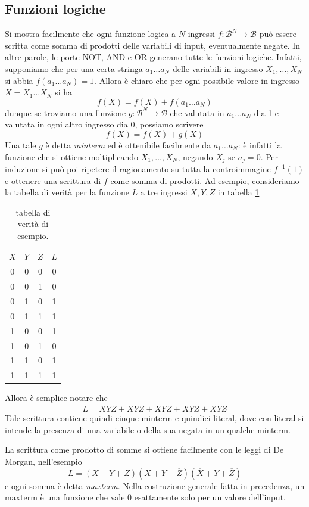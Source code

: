 \documentclass[a4paper, 11pt]{article}
\newcommand{\B}{\mathcal{B}}
\renewcommand{\sf}{\textsf}
\begin{document}
\subsection{Funzioni logiche}
Si mostra facilmente che ogni funzione logica a $N$ ingressi $f\colon\B^N\to \B$ può essere scritta come somma di prodotti delle variabili di input, eventualmente negate. In altre parole, le porte \sf{NOT}, \sf{AND} e \sf{OR} generano tutte le funzioni logiche. Infatti, supponiamo che per una certa stringa $a_1\ldots a_N$ delle variabili in ingresso $X_1,\ldots, X_N$ si abbia $f(a_1\ldots a_N)=1$. Allora è chiaro che per ogni possibile valore in ingresso $X=X_1\ldots X_N$ si ha
\[f(X)=f(X)+f(a_1\ldots a_N)\]
dunque se troviamo una funzione $g\colon\B^N\to\B$ che valutata in $a_1\ldots a_N$ dia 1 e valutata in ogni altro ingresso dia 0, possiamo scrivere
\[f(X)=f(X)+g(X)\]
Una tale $g$ è detta \emph{minterm} ed è ottenibile facilmente da $a_1\ldots a_N$: è infatti la funzione che si ottiene moltiplicando $X_1,\ldots, X_N$, negando $X_j$ se $a_j=0$. Per induzione si può poi ripetere il ragionamento su tutta la controimmagine $f^{-1}(1)$ e ottenere una scrittura di $f$ come somma di prodotti. Ad esempio, consideriamo la tabella di verità per la funzione $L$ a tre ingressi $X,Y,Z$ in tabella \ref{tab:tabver}
\begin{table}[h!]
	\centering
	\begin{tabular}{c c c | c}
		$X$&$Y$&$Z$&$L$\\\hline0&0&0&0\\0&0&1&0\\0&1&0&1\\0&1&1&1\\1&0&0&1\\1&0&1&0\\1&1&0&1\\1&1&1&1
	\end{tabular}
	\caption{tabella di verità di esempio.}
	\label{tab:tabver}
\end{table} 
Allora è semplice notare che
\[L=\overline{X}Y\overline{Z}+\overline{X}YZ+X\overline{Y}\overline{Z}+XY\overline{Z}+XYZ\]
Tale scrittura contiene quindi cinque minterm e quindici literal, dove con literal si intende la presenza di una variabile o della sua negata in un qualche minterm.

La scrittura come prodotto di somme si ottiene facilmente con le leggi di De Morgan, nell'esempio
\[L=(X+Y+Z)(X+Y+\overline{Z})(\overline{X}+Y+\overline{Z})\]
e ogni somma è detta \emph{maxterm}. Nella costruzione generale fatta in precedenza, un maxterm è una funzione che vale 0 esattamente solo per un valore dell'input.
\end{document}
